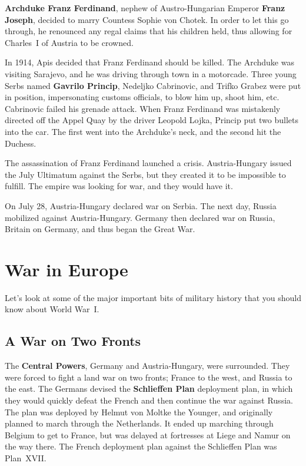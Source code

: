 \textbf{Archduke Franz Ferdinand}, nephew of Austro-Hungarian Emperor \textbf{Franz Joseph},
decided to marry Countess Sophie von Chotek.
In order to let this go through, he renounced any regal claims that his children held,
thus allowing for Charles~I of Austria to be crowned.

In 1914, Apis decided that Franz Ferdinand should be killed.
The Archduke was visiting Sarajevo, and he was driving through town in a motorcade.
Three young Serbs named \textbf{Gavrilo Princip}, Nedeljko Cabrinovic, and Trifko Grabez
were put in position, impersonating customs officials, to blow him up, shoot him, etc.
Cabrinovic failed his grenade attack.
When Franz Ferdinand was mistakenly directed off the Appel Quay by the driver Leopold Lojka,
Princip put two bullets into the car.
The first went into the Archduke's neck, and the second hit the Duchess.

The assassination of Franz Ferdinand launched a crisis.
Austria-Hungary issued the July Ultimatum against the Serbs,
but they created it to be impossible to fulfill.
The empire was looking for war, and they would have it.

On July 28, Austria-Hungary declared war on Serbia.
The next day, Russia mobilized against Austria-Hungary.
Germany then declared war on Russia,
Britain on Germany,
and thus began the Great War.

\section{War in Europe}

Let's look at some of the major important bits of military history that you should know about World War~I\@.

\subsection*{A War on Two Fronts}

The \textbf{Central Powers}, Germany and Austria-Hungary, were surrounded.
They were forced to fight a land war on two fronts; France to the west, and Russia to the east.
The Germans devised the \textbf{Schlieffen Plan} deployment plan,
in which they would quickly defeat the French and then continue the war against Russia.
The plan was deployed by Helmut von Moltke the Younger,
and originally planned to march through the Netherlands.
It ended up marching through Belgium to get to France,
but was delayed at fortresses at Liege and Namur on the way there.
The French deployment plan against the Schlieffen Plan was Plan~XVII\@.

